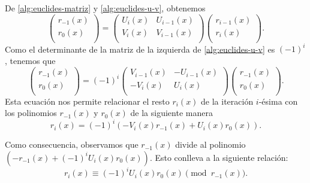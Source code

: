 De \eqref{alg:euclides-matriz} y \eqref{alg:euclides-u-v}, obtenemos
\[
    \left( 
        \begin{array}{c}  
            r_{-1}(x) \\
            r_{0}(x) \\
        \end{array} 
    \right)
    = 
    \left( 
        \begin{array}{cc}  
            U_i(x) & U_{i-1}(x) \\
            V_i(x) & V_{i-1}(x) \\
        \end{array} 
    \right)
    \left( 
        \begin{array}{c}  
            r_{i-1}(x) \\
            r_{i}(x) \\
        \end{array} 
    \right).
\]
Como el determinante de la matriz de la izquierda de \ref{alg:euclides-u-v} es $(-1)^i$, tenemos que
\[
    \left( 
        \begin{array}{c}  
            r_{-1}(x) \\
            r_{0}(x) \\
        \end{array} 
    \right)
    = 
    (-1)^i
    \left( 
        \begin{array}{cc}  
            V_{i-1}(x) & -U_{i-1}(x) \\
            -V_i(x) & U_{i}(x) \\
        \end{array} 
    \right)
    \left( 
        \begin{array}{c}  
            r_{-1}(x) \\
            r_{0}(x) \\
        \end{array} 
    \right).
\]
Esta ecuación nos permite relacionar el resto $r_i(x)$ de la iteración $i$-ésima con los polinomios $r_{-1}(x)$ y $r_0(x)$ de la siguiente manera
\begin{equation}
    \label{prop:relacion-r_i}
    r_i(x) = (-1)^i \left( -V_i(x) r_{-1}(x) + U_i(x) r_0(x) \right).
\end{equation}

Como consecuencia, observamos que $r_{-1}(x)$ divide al polinomio $\left( -r_{-1}(x) + (-1)^i U_i(x) r_0(x) \right)$. Esto conlleva a la siguiente relación:
\begin{equation}
    \label{prop:euclides-resto}
    r_i(x) \equiv (-1)^i U_i(x) r_0(x) \pmod{r_{-1}(x)}.
\end{equation}


